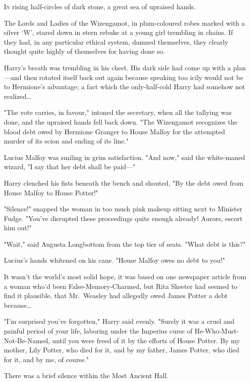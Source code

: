 
\lettrine{I}{n} rising
half-circles of dark stone, a great sea of upraised hands.

\quad\quad
The Lords and Ladies of the Wizengamot, in plum-coloured robes marked with a
silver `W', stared down in stern rebuke at a young girl trembling in chains. If
they had, in any particular ethical system, damned themselves, they clearly
thought quite highly of themselves for having done so.

Harry's breath was trembling in his chest. His dark side had come up with a
plan---and then rotated itself back out again because speaking too icily would
not be to Hermione's advantage; a fact which the only-half-cold Harry had
somehow not realized{\ldots}

"The vote carries, in favour," intoned the secretary, when all the tallying was
done, and the upraised hands fell back down. "The Wizengamot recognizes the
blood debt owed by Hermione Granger to House Malfoy for the attempted murder of
its scion and ending of its line."

Lucius Malfoy was smiling in grim satisfaction. "And now," said the white-maned
wizard, "I say that her debt shall be paid---"

Harry clenched his fists beneath the bench and shouted, "By the debt owed from
House Malfoy to House Potter!"

"Silence!" snapped the woman in too much pink makeup sitting next to Minister
Fudge. "You've disrupted these proceedings quite enough already! Aurors, escort
him out!"

"Wait," said Augusta Longbottom from the top tier of seats. "What debt is this?"

Lucius's hands whitened on his cane. "House Malfoy owes no debt to you!"

It wasn't the world's most solid hope, it was based on one newspaper article
from a woman who'd been False-Memory-Charmed, but Rita Skeeter had seemed to
find it plausible, that Mr.~Weasley had allegedly owed James Potter a debt
because{\ldots}

"I'm surprised you've forgotten," Harry said evenly. "Surely it was a cruel and
painful period of your life, laboring under the Imperius curse of
He-Who-Must-Not-Be-Named, until you were freed of it by the efforts of House
Potter. By my mother, Lily Potter, who died for it, and by my father, James
Potter, who died for it, and by me, of course."

There was a brief silence within the Most Ancient Hall.

